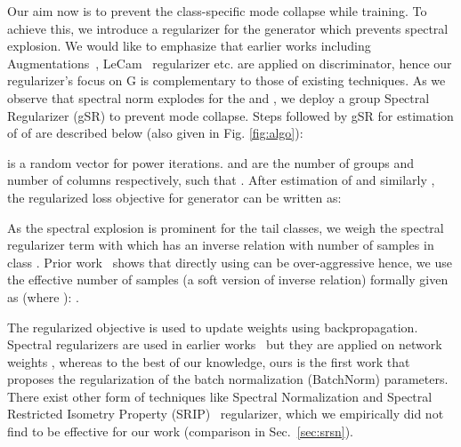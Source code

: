 \documentclass[runningheads,table]{llncs}
\begin{document}
Our aim now is to prevent the class-specific mode collapse while training. To achieve this, we introduce a regularizer for the generator  which prevents spectral explosion. We would like to emphasize that earlier works including Augmentations~\cite{zhao2020differentiable}, LeCam~\cite{tseng2021regularizing} regularizer etc. are applied on discriminator, hence our regularizer's focus on G is complementary to those of existing techniques. As we observe that spectral norm explodes for the  and , we deploy a group Spectral Regularizer (gSR) to prevent mode collapse. Steps followed by gSR for estimation of  of  are described below (also given in Fig. \ref{fig:algo}):



 is a random vector for power iterations.  and  are the number of groups and number of columns respectively, such that  . After estimation of  and similarly  , the regularized loss objective for generator can be written as:



As the spectral explosion is prominent for the tail classes, we weigh the spectral regularizer term with  which has an inverse relation with number of samples  in class . Prior work~\cite{cao2019learning} shows that directly using  can be over-aggressive hence, we use the effective number of samples (a soft version of inverse relation) formally given as (where ): .


The regularized objective is used to update weights using backpropagation. Spectral regularizers are used in earlier works~\cite{vahdat2020NVAE, yoshida2017spectral} but they are applied on network weights , whereas to the best of our knowledge, ours is the first work that proposes the regularization of the batch normalization (BatchNorm) parameters. There exist other form of techniques like Spectral Normalization and Spectral Restricted Isometry Property (SRIP)~\cite{bansal2018can} regularizer, which we empirically did not find to be effective for our work (comparison in Sec.~\ref{sec:srsn}). \\
\end{document}
